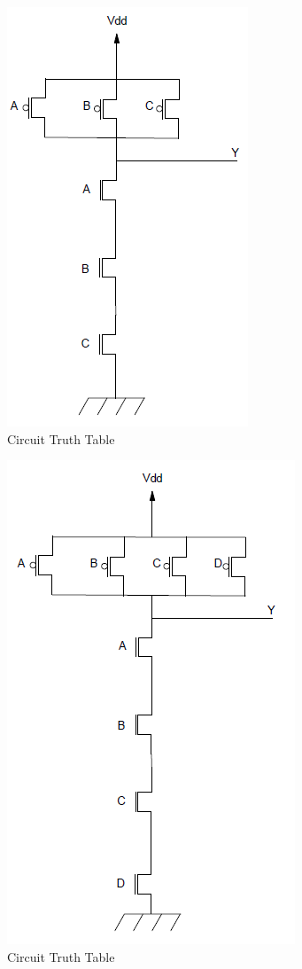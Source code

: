 \documentclass[12pt]{article}
\begin{document}
\begin{figure}[h]
	\centering
	\includegraphics[scale=.5]{NAND_3_Trans.png}
	\caption{Circuit Truth Table}
	\label{fig:3nandTran}
\end{figure}

\begin{figure}[h]
	\centering
	\includegraphics[scale=.5]{NAND_4_Trans.png}
	\caption{Circuit Truth Table}
	\label{fig:4nandTran}
\end{figure}
\end{document}
